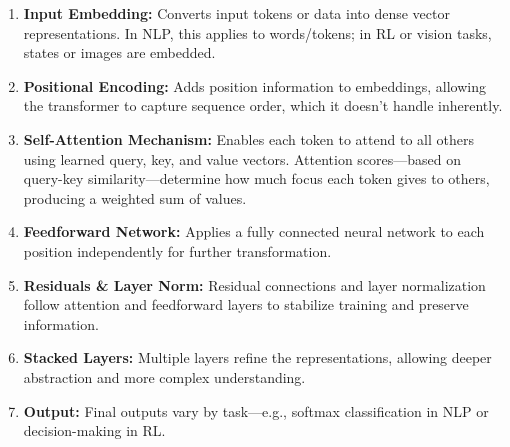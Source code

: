 \begin{enumerate}
\item \textbf{Input Embedding:} Converts input tokens or data into dense vector representations. In NLP, this applies to 
words/tokens; in RL or vision tasks, states or images are embedded.

\item \textbf{Positional Encoding:} Adds position information to embeddings, allowing the transformer to capture sequence 
order, which it doesn't handle inherently.

\item \textbf{Self-Attention Mechanism:} Enables each token to attend to all others using learned query, key, and value 
vectors. Attention scores—based on query-key similarity—determine how much focus each token gives to others, producing a 
weighted sum of values.

\item \textbf{Feedforward Network:} Applies a fully connected neural network to each position independently for further 
transformation.

\item \textbf{Residuals \& Layer Norm:} Residual connections and layer normalization follow attention and feedforward layers 
to stabilize training and preserve information.

\item \textbf{Stacked Layers:} Multiple layers refine the representations, allowing deeper abstraction and more complex 
understanding.

\item \textbf{Output:} Final outputs vary by task—e.g., softmax classification in NLP or decision-making in RL.
\end{enumerate}


